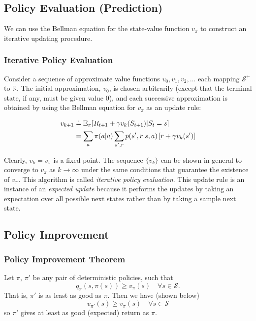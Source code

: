 \subsection{Policy Evaluation (Prediction)}
We can use the Bellman equation for the state-value function $v_\pi$ to construct an iterative updating procedure.

\subsubsection*{Iterative Policy Evaluation}
Consider a sequence of approximate value functions $v_0, v_1, v_2, \dots$ each mapping $\mathcal{S}^{+}$ to $\mathbb{R}$. The initial approximation, $v_0$, is chosen arbitrarily (except that the terminal state, if any, must be given value $0$), and each successive approximation is obtained by using the Bellman equation for $v_\pi$ as an update rule:

\begin{align}
    v_{k+1} &\doteq \mathbb{E}_\pi [R_{t+1} + \gamma v_{k}(S_{t+1}) | S_t = s] \\
            &= \sum_a \pi(a|a) \sum_{s', r} p(s', r| s, a) \left[r + \gamma v_k(s')\right]
\end{align}

Clearly, $v_k = v_\pi$ is a fixed point. The sequence $\{v_k\}$ can be shown in general to converge to $v_\pi$ as $k \to \infty$ under the same conditions that guarantee the existence of $v_\pi$. This algorithm is called \emph{iterative policy evaluation}. This update rule is an instance of an \emph{expected update} because it performs the updates by taking an expectation over all possible next states rather than by taking a sample next state.\\

\subsection{Policy Improvement}
\subsubsection*{Policy Improvement Theorem}

Let $\pi$, $\pi'$ be any pair of deterministic policies, such that
\begin{equation}
    q_\pi(s, \pi(s)) \geq v_\pi(s) \quad \forall s \in \mathcal{S}.
\end{equation}
That is, $\pi'$ is as least as good as $\pi$. Then we have (shown below)
\begin{equation}
    v_{\pi'}(s) \geq v_\pi(s) \quad \forall s \in \mathcal{S}
\end{equation}
so $\pi'$ gives at least as good (expected) return as $\pi$.\\

